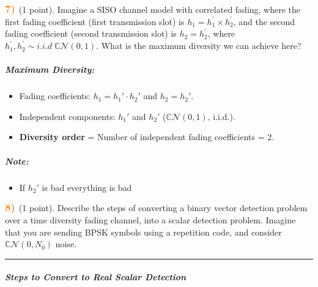 \documentclass[11pt]{article}
\providecommand{\tightlist}{%
      \setlength{\itemsep}{0pt}\setlength{\parskip}{0pt}}
\begin{document}
    \(\color{orange} \large \textbf{7)}\) (1 point). Imagine a SISO channel
model with correlated fading, where the first fading coefficient (first
transmission slot) is \(h_1 = h_1^\prime \times h_2^\prime\), and the
second fading coefficient (second transmission slot) is
\(h_2 = h_2^\prime\), where
\(h_1^\prime, h_2^\prime \sim i.i.d \; \mathbb{C}\mathcal{N}(0,1)\).
What is the maximum diversity we can achieve here?

    \subparagraph{Maximum Diversity:}\label{maximum-diversity}

\begin{itemize}
\tightlist
\item
  Fading coefficients: \(h_1 = h_1' \cdot h_2'\) and \(h_2 = h_2'\).
\item
  Independent components: \(h_1'\) and \(h_2'\)
  (\(\mathbb{C}\mathcal{N}(0,1)\), i.i.d.).
\item
  \textbf{Diversity order} = Number of independent fading coefficients =
  \(\boxed{2}\).
\end{itemize}

\subparagraph{Note:}\label{note}

\begin{itemize}
\tightlist
\item
  If \(h_2'\) is bad everything is bad
\end{itemize}

    \(\color{orange} \large \textbf{8)}\) (1 point). Describe the steps of
converting a binary vector detection problem over a time diversity
fading channel, into a scalar detection problem. Imagine that you are
sending BPSK symbols using a repetition code, and consider
\(\mathbb{C}\mathcal{N}(0,N_0)\) noise.

    \begin{center}\rule{0.5\linewidth}{0.5pt}\end{center}

\subparagraph{\texorpdfstring{\textbf{Steps to Convert to Real Scalar
Detection}}{Steps to Convert to Real Scalar Detection}}\label{steps-to-convert-to-real-scalar-detection}
\end{document}
